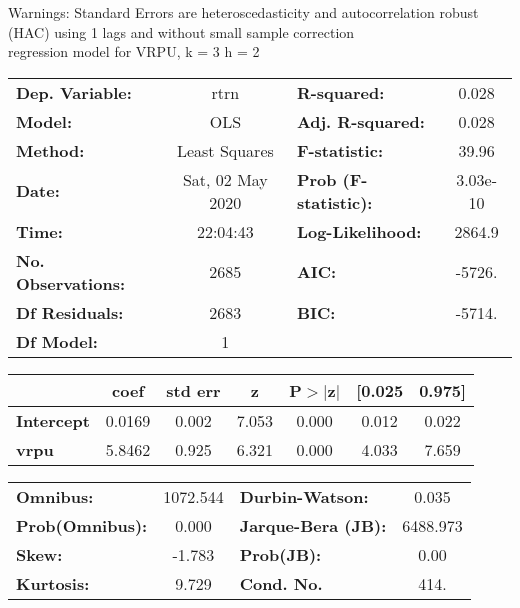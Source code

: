 Warnings: \newline
 [1] Standard Errors are heteroscedasticity and autocorrelation robust (HAC) using 1 lags and without small sample correction\\ 

regression model for VRPU, k = 3 h = 2\begin{center}
\begin{tabular}{lclc}
\toprule
\textbf{Dep. Variable:}    &       rtrn       & \textbf{  R-squared:         } &     0.028   \\
\textbf{Model:}            &       OLS        & \textbf{  Adj. R-squared:    } &     0.028   \\
\textbf{Method:}           &  Least Squares   & \textbf{  F-statistic:       } &     39.96   \\
\textbf{Date:}             & Sat, 02 May 2020 & \textbf{  Prob (F-statistic):} &  3.03e-10   \\
\textbf{Time:}             &     22:04:43     & \textbf{  Log-Likelihood:    } &    2864.9   \\
\textbf{No. Observations:} &        2685      & \textbf{  AIC:               } &    -5726.   \\
\textbf{Df Residuals:}     &        2683      & \textbf{  BIC:               } &    -5714.   \\
\textbf{Df Model:}         &           1      & \textbf{                     } &             \\
\bottomrule
\end{tabular}
\begin{tabular}{lcccccc}
                   & \textbf{coef} & \textbf{std err} & \textbf{z} & \textbf{P$> |$z$|$} & \textbf{[0.025} & \textbf{0.975]}  \\
\midrule
\textbf{Intercept} &       0.0169  &        0.002     &     7.053  &         0.000        &        0.012    &        0.022     \\
\textbf{vrpu}      &       5.8462  &        0.925     &     6.321  &         0.000        &        4.033    &        7.659     \\
\bottomrule
\end{tabular}
\begin{tabular}{lclc}
\textbf{Omnibus:}       & 1072.544 & \textbf{  Durbin-Watson:     } &    0.035  \\
\textbf{Prob(Omnibus):} &   0.000  & \textbf{  Jarque-Bera (JB):  } & 6488.973  \\
\textbf{Skew:}          &  -1.783  & \textbf{  Prob(JB):          } &     0.00  \\
\textbf{Kurtosis:}      &   9.729  & \textbf{  Cond. No.          } &     414.  \\
\bottomrule
\end{tabular}
\end{center}

